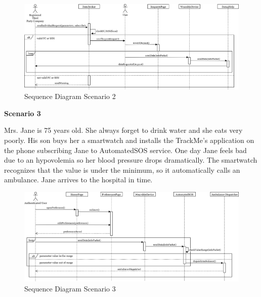 \documentclass[../main.tex]{subfiles}
\begin{document}
		\begin{figure}[H]
			\centering
			\includegraphics[scale=.05]{images/sequenceDiagram2.png}
			\caption{Sequence Diagram Scenario 2 \label{fig:Sequence Diagram Scenario 2}}
		\end{figure}
		\begin{minipage}{\textwidth}

		\end{minipage}
		\begin{minipage}[t]{\textwidth}
			{\bf Scenario 3}
			\vspace{3mm}

			Mrs. Jane is 75 years old. She always forget to drink water and she eats very poorly. His son buys her a smartwatch and installs the TrackMe's application on the phone subscribing Jane to AutomatedSOS service. One day Jane feels bad due to an hypovolemia so her blood pressure drops dramatically. The smartwatch recognizes that the value is under the minimum, so it automatically calls an ambulance. Jane arrives to the hospital in time.

			\vspace{5mm}
		\end{minipage}
		\begin{figure}[H]
			\centering
			\includegraphics[scale=.05]{images/sequenceDiagram3.png}
			\caption{Sequence Diagram Scenario 3 \label{fig:Sequence Diagram Scenario 3}}
		\end{figure}
		\begin{minipage}{\textwidth}

		\end{minipage}
\end{document}
